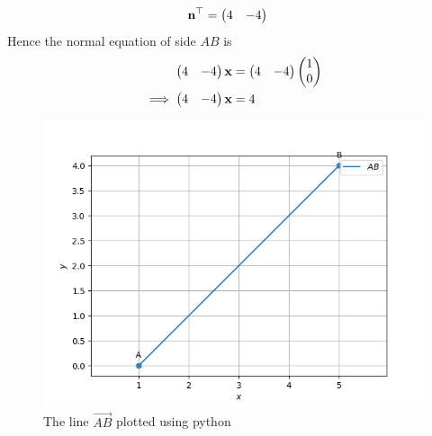 \documentclass[11pt]{book}
\begin{document}
\begin{enumerate}[label=\thesection.\arabic*.,ref=\thesection.\theenumi]
\begin{align}
  \mathbf{n}^{\top}&=\begin{pmatrix}4 & -4\end{pmatrix}
\end{align}
Hence the normal equation of side $AB$ is 
\begin{align}
    \begin{pmatrix}4 & -4\end{pmatrix}\mathbf{x}&=\begin{pmatrix}4 & -4\end{pmatrix}\begin{pmatrix}1\\0\end{pmatrix}\\
    \implies
    \begin{pmatrix}4 & -4\end{pmatrix}\mathbf{x}&=4
\end{align}
\begin{figure}
\includegraphics [width=\columnwidth] {figs/ABline.png}
\caption{ The line $\vec{AB}$ plotted using python}
\label{fig: lineab}
\end{figure}



\end{enumerate}
\end{document}
